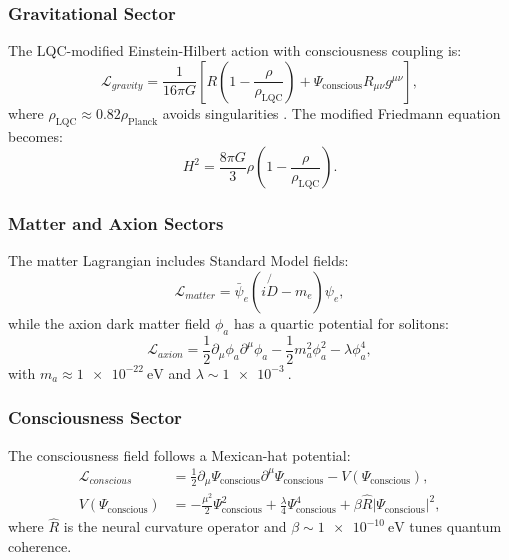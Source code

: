 \documentclass[11pt,a4paper,preprint]{article}
\newcommand{\Psicon}{\Psi_{\mathrm{conscious}}}
\newcommand{\phia}{\phi_a}
\newcommand{\La}{\mathcal{L}}
\newcommand{\Rhat}{\hat{R}}
\newcommand{\rhoLQC}{\rho_{\mathrm{LQC}}}
\begin{document}
\subsubsection{Gravitational Sector}
The LQC-modified Einstein-Hilbert action with consciousness coupling is:
\begin{equation}
    \La_{gravity} = \frac{1}{16\pi G} \left[ R \left(1 - \frac{\rho}{\rhoLQC}\right) + \Psicon R_{\mu\nu} g^{\mu\nu} \right],
    \label{eq:Lgravity}
\end{equation}
where $\rhoLQC \approx 0.82 \rho_{\mathrm{Planck}}$ avoids singularities \citep{bojowald2001}. The modified Friedmann equation becomes:
\begin{equation}
    H^2 = \frac{8\pi G}{3} \rho \left(1 - \frac{\rho}{\rhoLQC}\right).
    \label{eq:friedmann}
\end{equation}

\subsubsection{Matter and Axion Sectors}
The matter Lagrangian includes Standard Model fields:
\begin{equation}
    \La_{matter} = \bar{\psi}_e (i \not{D} - m_e) \psi_e,
\end{equation}
while the axion dark matter field $\phia$ has a quartic potential for solitons:
\begin{equation}
    \La_{axion} = \frac{1}{2} \partial_\mu \phia \partial^\mu \phia - \frac{1}{2} m_a^2 \phia^2 - \lambda \phia^4,
    \label{eq:Laxion}
\end{equation}
with $m_a \approx \SI{1e-22}{\electronvolt}$ and $\lambda \sim \SI{1e-3}{}$.

\subsubsection{Consciousness Sector}
The consciousness field follows a Mexican-hat potential:
\begin{align}
    \La_{conscious} &= \frac{1}{2} \partial_\mu \Psicon \partial^\mu \Psicon - V(\Psicon), \nonumber \\
    V(\Psicon) &= -\frac{\mu^2}{2} \Psicon^2 + \frac{\lambda}{4} \Psicon^4 + \beta \Rhat |\Psicon|^2,
    \label{eq:Lconscious}
\end{align}
where $\Rhat$ is the neural curvature operator and $\beta \sim \SI{1e-10}{\electronvolt}$ tunes quantum coherence.
\end{document}
